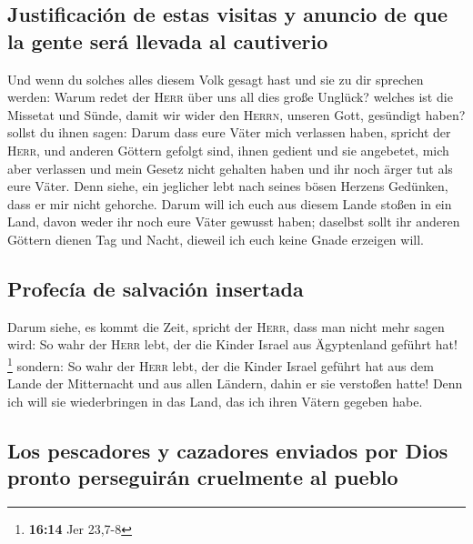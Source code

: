 \hypertarget{justificaciuxf3n-de-estas-visitas-y-anuncio-de-que-la-gente-seruxe1-llevada-al-cautiverio}{%
\subsection{Justificación de estas visitas y anuncio de que la gente
será llevada al
cautiverio}\label{justificaciuxf3n-de-estas-visitas-y-anuncio-de-que-la-gente-seruxe1-llevada-al-cautiverio}}

 Und wenn du solches alles diesem Volk gesagt hast und
sie zu dir sprechen werden: Warum redet der \textsc{Herr} über uns all
dies große Unglück? welches ist die Missetat und Sünde, damit wir wider
den \textsc{Herrn}, unseren Gott, gesündigt haben? 
sollst du ihnen sagen: Darum dass eure Väter mich verlassen haben,
spricht der \textsc{Herr}, und anderen Göttern gefolgt sind, ihnen
gedient und sie angebetet, mich aber verlassen und mein Gesetz nicht
gehalten haben  und ihr noch ärger tut als eure Väter.
Denn siehe, ein jeglicher lebt nach seines bösen Herzens Gedünken, dass
er mir nicht gehorche.  Darum will ich euch aus diesem
Lande stoßen in ein Land, davon weder ihr noch eure Väter gewusst haben;
daselbst sollt ihr anderen Göttern dienen Tag und Nacht, dieweil ich
euch keine Gnade erzeigen will.

\hypertarget{profecuxeda-de-salvaciuxf3n-insertada}{%
\subsection{Profecía de salvación
insertada}\label{profecuxeda-de-salvaciuxf3n-insertada}}

 Darum siehe, es kommt die Zeit, spricht der
\textsc{Herr}, dass man nicht mehr sagen wird: So wahr der \textsc{Herr}
lebt, der die Kinder Israel aus Ägyptenland geführt hat! \footnote{\textbf{16:14}
  Jer 23,7-8}  sondern: So wahr der \textsc{Herr} lebt,
der die Kinder Israel geführt hat aus dem Lande der Mitternacht und aus
allen Ländern, dahin er sie verstoßen hatte! Denn ich will sie
wiederbringen in das Land, das ich ihren Vätern gegeben habe.

\hypertarget{los-pescadores-y-cazadores-enviados-por-dios-pronto-perseguiruxe1n-cruelmente-al-pueblo}{%
\subsection{Los pescadores y cazadores enviados por Dios pronto
perseguirán cruelmente al
pueblo}\label{los-pescadores-y-cazadores-enviados-por-dios-pronto-perseguiruxe1n-cruelmente-al-pueblo}}

